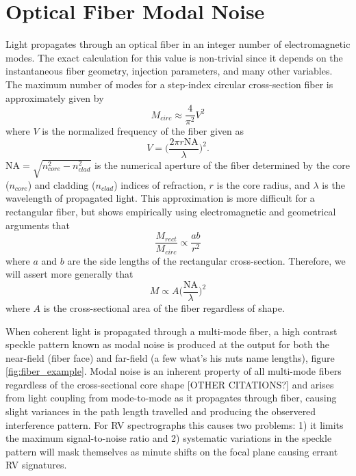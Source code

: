 \documentclass[twocolumn]{emulateapj}
\begin{document}
\section{Optical Fiber Modal Noise}
\label{sec:modal_noise_intro}

Light propagates through an optical fiber in an integer number of electromagnetic modes. The exact calculation for this value is non-trivial since it depends on the instantaneous fiber geometry, injection parameters, and many other variables. The maximum number of modes for a step-index circular cross-section fiber is approximately given by
\begin{equation}
M_{circ} \approx \frac{4}{\pi ^2} V^2
\label{eq:max_modes}
\end{equation}
where $V$ is the normalized frequency of the fiber given as
\begin{equation}
V = \Bigg( \frac{2 \pi r \mathrm{NA}}{\lambda} \Bigg) ^2 .
\label{eq:norm_freq}
\end{equation}
$\mathrm{NA} = \sqrt{n_{core}^2 - n_{clad}^2}$ is the numerical aperture of the fiber determined by the core ($n_{core}$) and cladding ($n_{clad}$) indices of refraction, $r$ is the core radius, and $\lambda$ is the wavelength of propagated light. This approximation is more difficult for a rectangular fiber, but \cite{Nikitin2011} shows empirically using electromagnetic and geometrical arguments that
\begin{equation}
\frac{M_{rect}}{M_{circ}} \propto \frac{ab}{r^2}
\label{eq:prop_modes}
\end{equation}
where $a$ and $b$ are the side lengths of the rectangular cross-section. Therefore, we will assert more generally that
\begin{equation}
M \propto A \Bigg( \frac{\mathrm{NA}}{\lambda} \Bigg) ^2
\label{eq:mode_area}
\end{equation}
where $A$ is the cross-sectional area of the fiber regardless of shape.


When coherent light is propagated through a multi-mode fiber, a high contrast speckle pattern known as modal noise is produced at the output for both the near-field (fiber face) and far-field (a few what's his nuts name lengths), figure \ref{fig:fiber_example}. Modal noise is an inherent property of all multi-mode fibers regardless of the cross-sectional core shape \citep{Sablowski2015} [OTHER CITATIONS?] and arises from light coupling from mode-to-mode as it propagates through fiber, causing slight variances in the path length travelled and producing the observered interference pattern. For RV spectrographs this causes two problems: 1) it limits the maximum signal-to-noise ratio and 2) systematic variations in the speckle pattern will mask themselves as minute shifts on the focal plane causing errant RV signatures.
\end{document}
